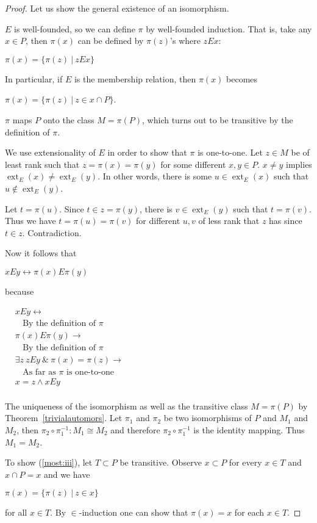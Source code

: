 \documentclass[8pt]{article}
\theoremstyle{definition}
\theoremstyle{definition}
\theoremstyle{definition}
\theoremstyle{definition}
\theoremstyle{definition}
\theoremstyle{definition}
\theoremstyle{definition}
\theoremstyle{definition}
\theoremstyle{definition}
\theoremstyle{definition}
\theoremstyle{definition}
\theoremstyle{definition}
\theoremstyle{definition}
\theoremstyle{definition}
\theoremstyle{question}
\begin{document}
\begin{proof} Let us show the general existence of an isomorphism.

$E$ is well-founded, so we can define $\pi$ by well-founded induction.
That is, take any $x \in P$, then $\pi(x)$ can be defined by $\pi(z)$'s where $z E x$:
\begin{center}
  $\pi(x) = \{ \pi(z) \: | \: z E x \}$
\end{center}
In particular, if $E$ is the membership relation, then $\pi(x)$ becomes
\begin{center}
  $\pi(x) = \{ \pi(z) \: | \: z \in x \cap P \}$.
\end{center}
$\pi$ maps $P$ onto the class $M = \pi(P)$, which turns out to be transitive by the definition of $\pi$.
 
We use extensionality of $E$ in order to show that $\pi$ is one-to-one.
Let $z \in M$ be of least rank such that $z = \pi(x) = \pi(y)$ for some different $x, y \in P$.
$x \neq y$ implies $\operatorname{ext}_E(x) \neq \operatorname{ext}_E(y)$. In other words,
there is some $u \in \operatorname{ext}_E(x)$ such that $u \notin \operatorname{ext}_E(y)$.

Let $t = \pi(u)$. Since $t \in z = \pi(y)$, there is $v \in \operatorname{ext}_E(y)$ such that
$t = \pi(v)$. Thus we have $t = \pi(u) = \pi(v)$ for different $u, v$ of less rank that $z$ has since $t \in z$. Contradiction.

Now it follows that
\begin{center}
  $x E y \leftrightarrow \pi(x) E \pi(y)$
\end{center}
because

  $\begin{array}{lll}
    & xEy \leftrightarrow & \\
    & \:\:\:\: \text{By the definition of $\pi$}& \\
    & \pi(x) E \pi(y) \to & \\
    & \:\:\:\: \text{By the definition of $\pi$}& \\
    & \exists z \: z E y \: \& \: \pi(x) = \pi(z) \to & \\
    & \:\:\:\: \text{As far as $\pi$ is one-to-one}& \\
    & x = z \land x E y & \\
  \end{array}$

The uniqueness of the isomorphism as well as the transitive class $M = \pi(P)$
by Theorem~\ref{trivialautomors}. Let $\pi_1$ and $\pi_2$ be two isomorphisms of $P$ and $M_1$ and $M_2$,
then $\pi_2 \circ \pi_1^{-1} : M_1 \cong M_2$ and therefore $\pi_2 \circ \pi_1^{-1}$ is the identity mapping.
Thus $M_1 = M_2$.

To show (\ref{most:iii}), let $T \subset P$ be transitive. 
Observe $x \subset P$ for every $x \in T$ and $x \cap P = x$ and we have
\begin{center}
  $\pi(x) = \{ \pi(z) \: | \: z \in x \}$
\end{center}
for all $x \in T$. By $\in$-induction one can show that $\pi(x) = x$ for each $x \in T$.
\end{proof}
\end{document}
